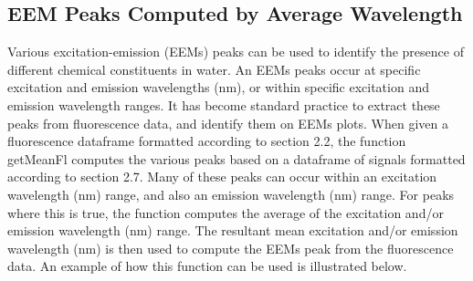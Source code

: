 \documentclass[a4paper,11pt]{article}\usepackage[]{graphicx}\usepackage[]{color}
\begin{document}
\subsection{EEM Peaks Computed by Average Wavelength}
Various excitation-emission (EEMs) peaks can be used to identify the presence of different chemical constituents in water. An EEMs peaks occur at specific excitation and emission wavelengths (nm), or within specific excitation and emission wavelength ranges. It has become standard practice to extract these peaks from fluorescence data, and identify them on EEMs plots. When given a fluorescence dataframe formatted according to section 2.2, the function getMeanFl computes the various peaks based on a dataframe of signals formatted according to section 2.7. Many of these peaks can occur within an excitation wavelength (nm) range, and also an emission wavelength (nm) range. For peaks where this is true, the function computes the average of the excitation and/or emission wavelength (nm) range. The resultant mean excitation and/or emission wavelength (nm) is then used to compute the EEMs peak from the fluorescence data. An example of how this function can be used is illustrated below.
\end{document}
